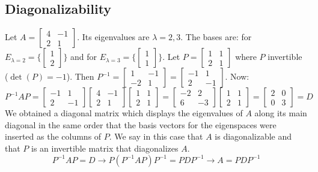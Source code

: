 \documentclass[12pt]{article}
\begin{document}
\subsection{Diagonalizability} 
Let $A = \begin{bmatrix} 4 & -1 \\ 2 & 1 \end{bmatrix}$. Its eigenvalues are $\lambda = 2, 3$. The bases are: for $E_{\lambda = 2} = \{\begin{bmatrix} 1 \\ 2 \end{bmatrix}\}$ and for $E_{\lambda = 3} = \{\begin{bmatrix} 1 \\ 1 \end{bmatrix}\}$. Let $P = \begin{bmatrix} 1 & 1 \\ 2 & 1 \end{bmatrix}$ where $P$ invertible ($\det(P) = -1$). Then $P^{-1} = \begin{bmatrix} 1 & -1 \\ -2 & 1 \end{bmatrix} = \begin{bmatrix} -1 & 1 \\ 2 & -1 \end{bmatrix}$. Now: $$P^{-1}AP = \begin{bmatrix} -1 & 1 \\ 2 & -1 \end{bmatrix}\begin{bmatrix} 4 & -1 \\ 2 & 1 \end{bmatrix}\begin{bmatrix} 1 & 1 \\ 2 & 1 \end{bmatrix} = \begin{bmatrix} -2 & 2 \\ 6 & -3 \end{bmatrix}\begin{bmatrix} 1 & 1 \\ 2 & 1 \end{bmatrix} = \begin{bmatrix} 2 & 0 \\ 0 & 3 \end{bmatrix} = D $$ We obtained a diagonal matrix which displays the eigenvalues of $A$ along its main diagonal in the same order that the basis vectors for the eigenspaces were inserted as the columns of $P$. We say in this case that $A$ is diagonalizable and that $P$ is an invertible matrix that diagonalizes $A$. $$ P^{-1}AP = D \rightarrow P(P^{-1}AP)P^{-1} = PDP^{-1} \rightarrow A = PDP^{-1} $$ 
\end{document}
